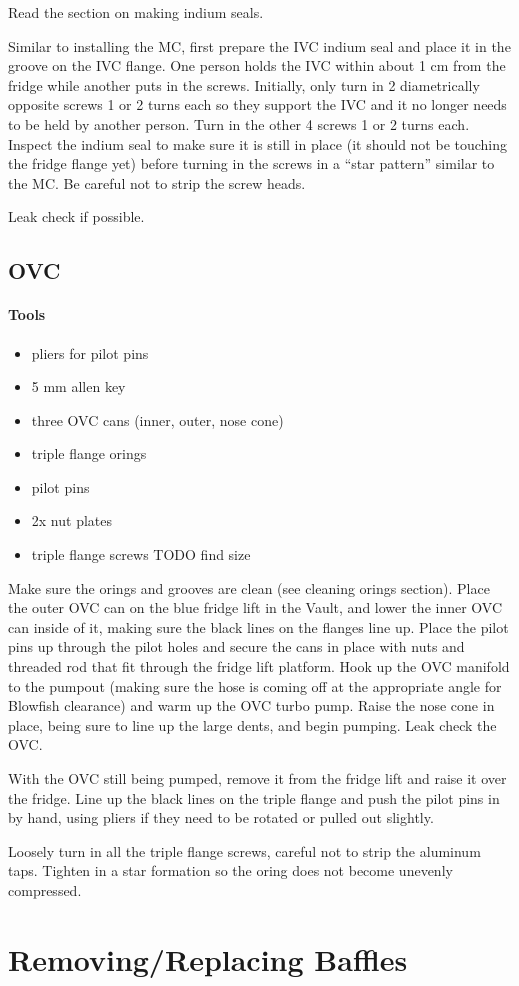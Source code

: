 Read the section on making indium seals.

Similar to installing the MC, first prepare the IVC indium seal and place it in the groove on the IVC flange.  One person holds the IVC within about 1 cm from the fridge while another puts in the screws.  Initially, only turn in 2 diametrically opposite screws 1 or 2 turns each so they support the IVC and it no longer needs to be held by another person.  Turn in the other 4 screws 1 or 2 turns each.  Inspect the indium seal to make sure it is still in place (it should not be touching the fridge flange yet) before turning in the screws in a ``star pattern'' similar to the MC.  Be careful not to strip the screw heads.


Leak check if possible.


  \subsection{OVC}

\paragraph{Tools}
\begin{itemize}
 \item pliers for pilot pins
\item 5 mm allen key
\item three OVC cans (inner, outer, nose cone)
\item triple flange orings
\item pilot pins
\item 2x nut plates
\item triple flange screws TODO find size
\end{itemize}

Make sure the orings and grooves are clean (see cleaning orings section).  Place the outer OVC can on the blue fridge lift in the Vault, and lower the inner OVC can inside of it, making sure the black lines on the flanges line up.  Place the pilot pins up through the pilot holes and secure the cans in place with nuts and threaded rod that fit through the fridge lift platform.  Hook up the OVC manifold to the pumpout (making sure the hose is coming off at the appropriate angle for Blowfish clearance) and warm up the OVC turbo pump.  Raise the nose cone in place, being sure to line up the large dents, and begin pumping.  Leak check the OVC.


With the OVC still being pumped, remove it from the fridge lift and raise it over the fridge.  Line up the black lines on the triple flange and push the pilot pins in by hand, using pliers if they need to be rotated or pulled out slightly.


Loosely turn in all the triple flange screws, careful not to strip the aluminum taps.  Tighten in a star formation so the oring does not become unevenly compressed.

\section{Removing/Replacing \het{} Baffles}